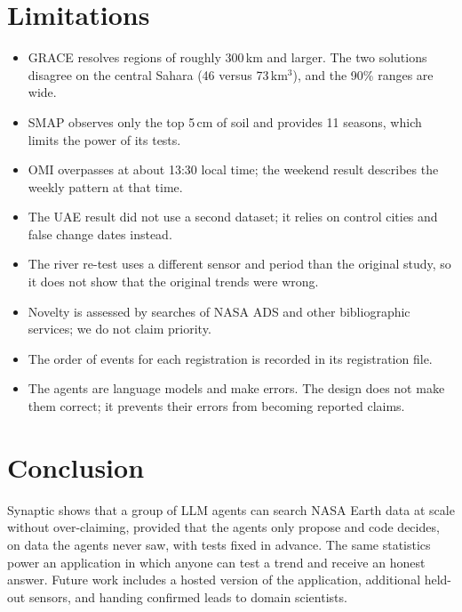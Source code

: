\documentclass[11pt,a4paper]{article}
\newcommand{\km}{\,km$^3$}
\begin{document}
\section{Limitations}
\label{sec:limitations}
\begin{itemize}
  \item GRACE resolves regions of roughly 300\,km and larger. The two solutions disagree on the central Sahara (46
        versus 73\km{}), and the 90\% ranges are wide.
  \item SMAP observes only the top 5\,cm of soil and provides 11 seasons, which limits the power of its tests.
  \item OMI overpasses at about 13:30 local time; the weekend result describes the weekly pattern at that time.
  \item The UAE result did not use a second dataset; it relies on control cities and false change dates instead.
  \item The river re-test uses a different sensor and period than the original study, so it does not show that the
        original trends were wrong.
  \item Novelty is assessed by searches of NASA ADS and other bibliographic services; we do not claim priority.
  \item The order of events for each registration is recorded in its registration file.
  \item The agents are language models and make errors. The design does not make them correct; it prevents their
        errors from becoming reported claims.
\end{itemize}

\section{Conclusion}
Synaptic shows that a group of LLM agents can search NASA Earth data at scale without over-claiming, provided that the
agents only propose and code decides, on data the agents never saw, with tests fixed in advance. The same statistics
power an application in which anyone can test a trend and receive an honest answer. Future work includes a hosted
version of the application, additional held-out sensors, and handing confirmed leads to domain scientists.

\end{document}
